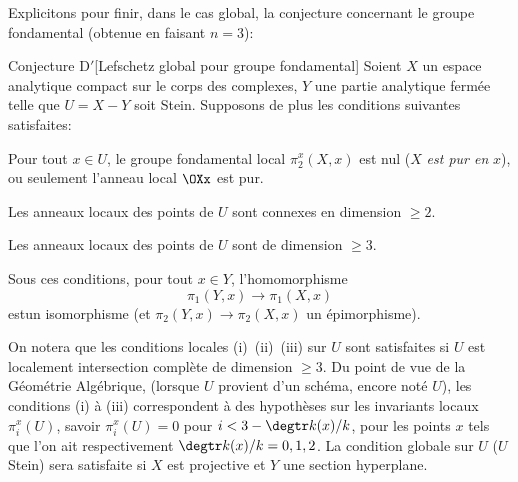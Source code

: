 Explicitons pour finir, dans le \og cas global\fg {}, la conjecture concernant le groupe fondamental (obtenue en faisant $n=3$):


\label{XIII.6.D'}
\begin{enonce*}{Conjecture D$\boldsymbol'$}[Lefschetz global pour groupe fondamental\ndemark]
Soient $X$ un espace analytique compact sur le corps des complexes, $Y$ une partie analytique ferm\'ee telle que $U=X-Y$ soit Stein. Supposons de plus les conditions suivantes satisfaites:
\begin{enumeratei}
\item
Pour tout $x\in U$, le groupe fondamental local $\pi_2^x(X, x)$ est nul (\ie $X$ \emph{est \og pur en }$x${\fg}), ou seulement l'anneau local $\OXx$ est pur.
\item
Les anneaux locaux des points de $U$ sont \og connexes en dimension $\geq 2$\fg.
\item
Les anneaux locaux des points de $U$ sont de dimension $\geq 3$.
\end{enumeratei}

Sous ces conditions, pour tout $x\in Y$, l'homomorphisme
$$
\pi_1(Y, x)\to\pi_1(X, x)
$$
est\pageoriginale un isomorphisme (et $\pi_2(Y, x)\to\pi_2(X, x)$ un \'epimorphisme).
\end{enonce*}

On notera que les conditions locales (i)~(ii)~(iii) sur $U$ sont satisfaites si $U$ est localement intersection compl\`ete de dimension $\geq 3$. Du point de vue de la G\'eom\'etrie Alg\'ebrique, (lorsque $U$ provient d'un sch\'ema, encore not\'e $U$), les conditions (i) \`a (iii) correspondent \`a des hypoth\`eses sur les invariants locaux $\pi_i^x(U)$,  savoir \hbox{$\pi_i^x(U)=0$} pour $i<3-\degtr k(x)/k$, pour les points $x$ tels que l'on ait respectivement $\degtr k(x)/k=0, 1, 2$. La condition globale sur $U$ ($U$ Stein) sera satisfaite si $X$ est projective et $Y$ une section hyperplane.

